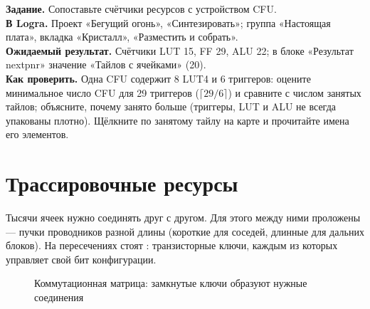 \begin{diybox}
\textbf{Задание.} Сопоставьте счётчики ресурсов с устройством CFU.\\
\textbf{В Logra.} Проект «Бегущий огонь», «Синтезировать»; группа «Настоящая плата», вкладка «Кристалл», «Разместить и собрать».\\
\textbf{Ожидаемый результат.} Счётчики LUT 15, FF 29, ALU 22; в блоке «Результат nextpnr» значение «Тайлов с ячейками» (20).\\
\textbf{Как проверить.} Одна CFU содержит 8 LUT4 и 6 триггеров: оцените минимальное число CFU для 29 триггеров ($\lceil 29/6\rceil$) и сравните с числом занятых тайлов; объясните, почему занято больше (триггеры, LUT и ALU не всегда упакованы плотно).  Щёлкните по занятому тайлу на карте и прочитайте имена его элементов.
\end{diybox}

\section{Трассировочные ресурсы}

Тысячи ячеек нужно соединять друг с другом. Для этого между ними проложены
 --- пучки проводников разной длины (короткие для
соседей, длинные для дальних блоков). На пересечениях стоят
: транзисторные ключи, каждым из которых
управляет свой бит конфигурации.

\begin{figure}[H]
\centering
{}
\caption{Коммутационная матрица: замкнутые ключи образуют нужные соединения}
\end{figure}

